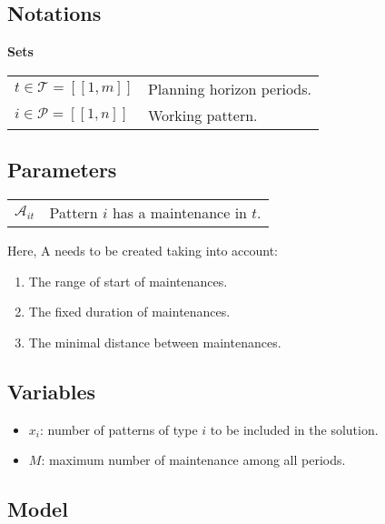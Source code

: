 \documentclass[a4paper,11pt]{article}
\begin{document}
    \subsection{Notations}

    \textbf{Sets}

    \begin{tabular}{ll}
    $t\in \mathcal{T} = [\![1, m]\!]$ & Planning horizon periods. \\
    $i \in \mathcal{P} = [\![1, n]\!]$ & Working pattern.\\
    \end{tabular}

    \vskip 0.3cm

    \subsection{Parameters}

    \begin{tabular}{ll}
        $\mathcal{A}_{it}$ & Pattern $i$ has a maintenance in $t$.\\
    \end{tabular}

    \vskip 0.3cm

    Here, A needs to be created taking into account:

    \begin{enumerate}
        \item The range of start of maintenances.
        \item The fixed duration of maintenances.
        \item The minimal distance between maintenances.
    \end{enumerate}

    \subsection{Variables}

    \begin{itemize}
        \item $x_i$: number of patterns of type $i$ to be included in the solution.
        \item $M$: maximum number of maintenance among all periods.
    \end{itemize}

    \subsection{Model}
\end{document}
